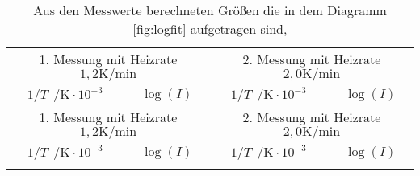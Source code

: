 \begin{longtable}{c c || c c}
  \caption{Aus den Messwerte berechneten Größen die in dem Diagramm \ref{fig:logfit} aufgetragen sind,}
  \label{tab:nahrung}\\

  \toprule
  \multicolumn{2}{c}{1. Messung mit Heizrate $1,2 \si{\kelvin\per\minute}$ } & \multicolumn{2}{c}{2. Messung mit Heizrate $2,0 \si{\kelvin\per\minute}$ }\\
  $1/T \ \ \si{\per\kelvin} \cdot 10^{-3}$  & $\log(I)$ & $1/T \ \ \si{\per\kelvin} \cdot 10^{-3}$  & $\log(I)$\\
  \midrule
  \endfirsthead
  \hline
  \multicolumn{2}{c}{1. Messung mit Heizrate $1,2 \si{\kelvin\per\minute}$ } & \multicolumn{2}{c}{2. Messung mit Heizrate $2,0 \si{\kelvin\per\minute}$ }\\
  $1/T \ \ \si{\per\kelvin} \cdot 10^{-3}$  & $\log(I)$ & $1/T \ \ \si{\per\kelvin} \cdot 10^{-3}$  & $\log(I)$\\
  \midrule
  \endhead
  \hline
  \endfoot
  \bottomrule
  \endlastfoot


\end{longtable}
